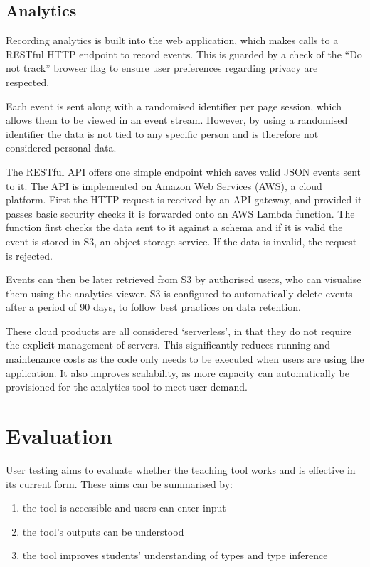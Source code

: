 \documentclass[a4paper,fleqn,oneside,12pt]{report}
\begin{document}
\section{Analytics}\label{id:h.39bhrrv1fi5p}
Recording analytics is built into the web application, which makes calls to a RESTful HTTP endpoint to record events. This is guarded by a check of the “Do not track” browser flag to ensure user preferences regarding privacy are respected.

Each event is sent along with a randomised identifier per page session, which allows them to be viewed in an event stream. However, by using a randomised identifier the data is not tied to any specific person and is therefore not considered personal data.

The RESTful API offers one simple endpoint which saves valid JSON events sent to it. The API is implemented on Amazon Web Services (AWS), a cloud platform. First the HTTP request is received by an API gateway, and provided it passes basic security checks it is forwarded onto an AWS Lambda function. The function first checks the data sent to it against a schema and if it is valid the event is stored in S3, an object storage service. If the data is invalid, the request is rejected.

Events can then be later retrieved from S3 by authorised users, who can visualise them using the analytics viewer. S3 is configured to automatically delete events after a period of 90 days, to follow best practices on data retention.

These cloud products are all considered ‘serverless’, in that they do not require the explicit management of servers. This significantly reduces running and maintenance costs as the code only needs to be executed when users are using the application. It also improves scalability, as more capacity can automatically be provisioned for the analytics tool to meet user demand.
\chapter{Evaluation}\label{id:h.e6letww4nhn0}
User testing aims to evaluate whether the teaching tool works and is effective in its current form. These aims can be summarised by:
\begin{enumerate}
  \item the tool is accessible and users can enter input
  \item the tool’s outputs can be understood
  \item the tool improves students’ understanding of types and type inference
\end{enumerate}
\end{document}

